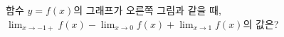 \noindent\begin{minipage}[t]{0.58\linewidth}\vspace{0pt}\raggedright 함수 $y=f(x)$의 그래프가 오른쪽 그림과 같을 때, $\displaystyle\lim_{x\to-1+} f(x)-\lim_{x\to 0} f(x)+\lim_{x\to 1} f(x)$의 값은?\end{minipage}\hfill\begin{minipage}[t]{0.4\linewidth}\vspace{0pt}\centering \resizebox{\ifdim\width>\linewidth\linewidth\else\width\fi}{!}{}\end{minipage}\par
{}
